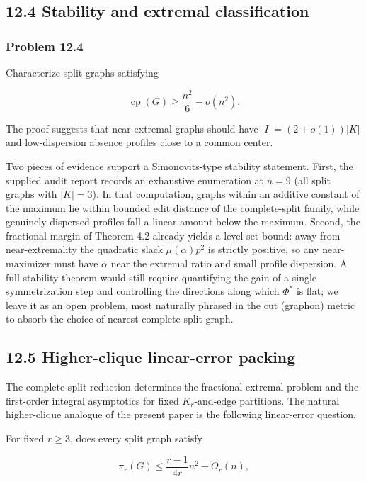 \documentclass[english,11pt,a4paper]{article}
\begin{document}
\subsection{12.4 Stability and extremal
classification}\label{stability-and-extremal-classification}

\subsubsection{Problem 12.4}\label{problem-12.4}

Characterize split graphs satisfying

\[
\operatorname{cp}(G)
\ge
\frac{n^2}{6}-o(n^2).
\]

The proof suggests that near-extremal graphs should have
\(|I|=(2+o(1))|K|\) and low-dispersion absence profiles close to a
common center.

Two pieces of evidence support a Simonovits-type stability statement.
First, the supplied audit report records an exhaustive enumeration at
\(n=9\) (all split graphs with \(|K|=3\)). In that computation, graphs
within an additive constant of the maximum lie within bounded edit
distance of the complete-split family, while genuinely dispersed
profiles fall a linear amount below the maximum. Second, the fractional
margin of Theorem 4.2 already yields a level-set bound: away from
near-extremality the quadratic slack \(\mu(\alpha)p^2\) is strictly
positive, so any near-maximizer must have \(\alpha\) near the extremal
ratio and small profile dispersion. A full stability theorem would still
require quantifying the gain of a single symmetrization step and
controlling the directions along which \(\Phi^*\) is flat; we leave it
as an open problem, most naturally phrased in the cut (graphon) metric
to absorb the choice of nearest complete-split graph.

\subsection{12.5 Higher-clique linear-error
packing}\label{higher-clique-linear-error-packing}

The complete-split reduction determines the fractional extremal problem
and the first-order integral asymptotics for fixed \(K_r\)-and-edge
partitions. The natural higher-clique analogue of the present paper is
the following linear-error question.

For fixed \(r\ge3\), does every split graph satisfy

\[
\pi_r(G)
\le
\frac{r-1}{4r}n^2+O_r(n),
\]
\end{document}
